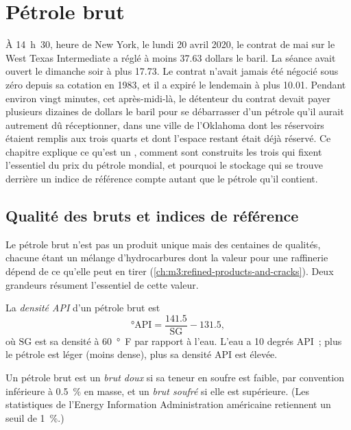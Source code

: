\chapter{Pétrole brut}\label{ch:m3:crude-oil}

À 14~h~30, heure de New York, le lundi 20 avril 2020, le contrat de mai sur le West Texas
Intermediate a réglé à moins 37.63 dollars le baril. La séance avait
ouvert le dimanche soir à plus 17.73. Le contrat n'avait jamais été négocié sous zéro
depuis sa cotation en 1983, et il a expiré le lendemain à plus 10.01. Pendant environ
vingt minutes, cet après-midi-là, le détenteur du contrat devait payer plusieurs dizaines de dollars
le baril pour se débarrasser d'un pétrole qu'il aurait autrement dû réceptionner, dans une ville de
l'Oklahoma dont les réservoirs étaient remplis aux trois quarts et dont l'espace restant était déjà
réservé. Ce chapitre explique ce qu'est un , comment sont construits les trois qui
fixent l'essentiel du prix du pétrole mondial, et pourquoi le stockage qui se trouve derrière un
indice de référence compte autant que le pétrole qu'il contient.

\section{Qualité des bruts et indices de référence}

Le pétrole brut n'est pas un produit unique mais des centaines de qualités, chacune étant un mélange
d'hydrocarbures dont la valeur pour une raffinerie dépend de ce qu'elle peut en tirer
(\cref{ch:m3:refined-products-and-cracks}). Deux grandeurs résument l'essentiel de cette
valeur.

\begin{definition}\label{def:m3:crude-oil:api}
La \emph{densité API} d'un pétrole brut est
\[
\text{°API} = \frac{141.5}{\mathrm{SG}} - 131.5 ,
\]
où $\mathrm{SG}$ est sa densité à \qty{60}{\degree F} par rapport à l'eau.
L'eau a 10 degrés API~; plus le pétrole est léger (moins dense), plus sa
densité API est élevée.
\end{definition}

\begin{definition}\label{def:m3:crude-oil:sweet}
Un pétrole brut est un \emph{brut doux} si sa teneur en soufre est
faible, par convention inférieure à 0.5~\% en masse, et un \emph{brut soufré}
si elle est supérieure. (Les statistiques de l'Energy Information Administration américaine
retiennent un seuil de 1~\%.)
\end{definition}

